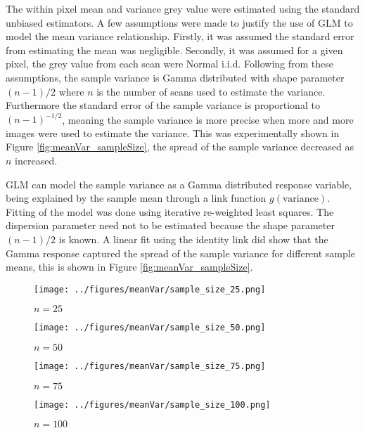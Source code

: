 \documentclass[a4paper]{proc}
\begin{document}
The within pixel mean and variance grey value were estimated using the standard unbiased estimators. A few assumptions were made to justify the use of GLM to model the mean variance relationship. Firstly, it was assumed the standard error from estimating the mean was negligible. Secondly, it was assumed for a given pixel, the grey value from each scan were Normal i.i.d. Following from these assumptions, the sample variance is Gamma distributed with shape parameter $(n-1)/2$ where $n$ is the number of scans used to estimate the variance. Furthermore the standard error of the sample variance is proportional to $(n-1)^{-1/2}$, meaning the sample variance is more precise when more and more images were used to estimate the variance. This was experimentally shown in Figure \ref{fig:meanVar_sampleSize}, the spread of the sample variance decreased as $n$ increased.

GLM can model the sample variance as a Gamma distributed response variable, being explained by the sample mean through a link function $g(\text{variance})$. Fitting of the model was done using iterative re-weighted least squares. The dispersion parameter need not to be estimated because the shape parameter $(n-1)/2$ is known. A linear fit using the identity link did show that the Gamma response captured the spread of the sample variance for different sample means, this is shown in Figure \ref{fig:meanVar_sampleSize}.

\begin{figure*}
	\centering
	\begin{subfigure}{0.45\textwidth}
		\centering
		\texttt{[image: ../figures/meanVar/sample\_size\_25.png]}
		\caption{$n=25$}
	\end{subfigure}
	\begin{subfigure}{0.45\textwidth}
		\centering
		\texttt{[image: ../figures/meanVar/sample\_size\_50.png]}
		\caption{$n=50$}
	\end{subfigure}
	\begin{subfigure}{0.45\textwidth}
		\centering
		\texttt{[image: ../figures/meanVar/sample\_size\_75.png]}
		\caption{$n=75$}
	\end{subfigure}
	\begin{subfigure}{0.45\textwidth}
		\centering
		\texttt{[image: ../figures/meanVar/sample\_size\_100.png]}
		\caption{$n=100$}
	\end{subfigure}
	\caption{Within pixel mean and variance grey value frequency density plot of each pixel in the segmented image of the 3D printed sample. The sample variance and sample mean were estimated using $n$ scans selected at random without replacement. A Gamma GLM was fitted with the identity link. The solid and dotted lines are the mean response and the $\Phi(\pm 1)$ quantiles respectively.}
	\label{fig:meanVar_sampleSize}
\end{figure*}
\end{document}
